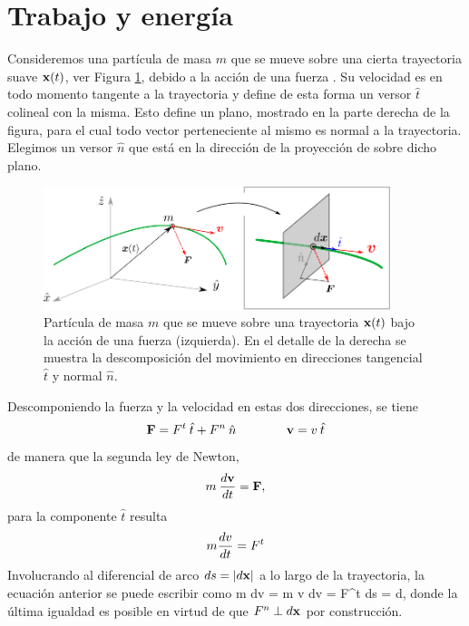 \documentclass[10pt,oneside]{CBFT_book}
\begin{document}
\section{Trabajo y energía}

Consideremos una partícula de masa $ m $ que se mueve sobre una cierta trayectoria suave $\vb{x}(t)$, ver {Figura} 
\ref{fig_mc_workenergy}, debido a la acción de una fuerza .
Su velocidad  es en todo momento tangente a la trayectoria y define de esta forma un versor $ \hat{t} $
colineal con la misma. Esto define un plano, mostrado en la parte derecha de la figura, para el cual todo vector
perteneciente al mismo es normal a la trayectoria. Elegimos un versor $ \hat{n} $ que está en la dirección de
la proyección de  sobre dicho plano.

\begin{figure}[!h]
	\begin{center}
	\includegraphics[width=0.9\textwidth]{images/fig_mc_workandenergy.pdf}	
	\end{center}
	\caption{Partícula de masa $m$ que se mueve sobre una trayectoria $\vb{x}(t)$ bajo la acción de una fuerza 
 (izquierda). En el detalle de la derecha se muestra la descomposición del movimiento en direcciones
tangencial $\hat{t}$ y normal $\hat{n}$.}
	\label{fig_mc_workenergy}
\end{figure} 

Descomponiendo la fuerza y la velocidad en estas dos direcciones, se tiene 
\[
	\vb{F} = F^t \: \hat{t}  + F^n \: \hat{n} \qquad \qquad \vb{v} = v \: \hat{t}
\]
de manera que la segunda ley de Newton, 
\[
	m \: \dtot{\vb{v}}{t} = \vb{F},
\]
para la componente $\hat{t}$ resulta
\[
	m \frac{d^{\hspace{-0.05em}} {v}}{d {t}^{\hspace{-0.05em}}} = F^t
\]
Involucrando al diferencial de arco $ ds = | d\vb{x} | $ a lo largo de la trayectoria, la ecuación anterior se
puede escribir como
\be
	m \: dv \: = m \: v \: dv = F^t \: ds =  \cdot d,
	\label{ec_trabajo}
\ee
donde la última igualdad es posible en virtud de que $ F^n \perp d\vb{x} $ por construcción.
\end{document}
